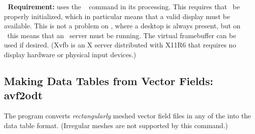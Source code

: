 \textbf{\Tk\ Requirement:}  uses the
\Tk\  command in its processing.  This requires that \Tk\ be
properly initialized, which in particular means that a valid display
must be available.  This is not a problem on \Windows, where a desktop
is always present, but on \Unix\ this means that an \X\ server must be
running.  The
virtual framebuffer can be used if desired.  (Xvfb is an X server
distributed with X11R6 that requires no display hardware or physical
input devices.)


\subsection{Making Data Tables from Vector Fields:
          avf2odt}\label{sec:avf2odt}%
%
The  program converts \textit{rectangularly} meshed vector field
files in any of the  into the  data table format.  (Irregular meshes are
not supported by this command.)


